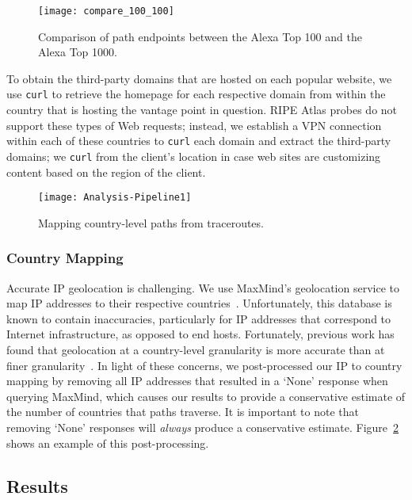 \begin{figure}[t]
\centering
\texttt{[image: compare\_100\_100]}
\caption{Comparison of path endpoints between the Alexa Top 100 and the Alexa Top 1000.}
\label{fig:compare_alexas}
\end{figure}

To obtain the third-party domains that are hosted on each popular website, we
use {\tt curl} to retrieve the homepage for each respective domain from within
the country that is hosting the vantage point in question.  RIPE Atlas probes
do not support these types of Web requests; instead, we establish a VPN
connection within each of these countries to {\tt curl} each domain and
extract the third-party domains; we {\tt curl} from the client's location in
case web sites are customizing content based on the region of the client.

\begin{figure}[t]
\centering
\texttt{[image: Analysis-Pipeline1]}
\caption{Mapping country-level paths from traceroutes.}
\label{fig:analysis_pipeline}
\end{figure}


\subsubsection{Country Mapping}
\label{c_map}

Accurate IP geolocation is challenging. We use MaxMind's
geolocation service to map IP addresses to their respective
countries~\cite{maxmind}. Unfortunately, this database is known to contain inaccuracies,
particularly for IP addresses that correspond to Internet infrastructure, as opposed
to end hosts.  Fortunately, previous work has found that
geolocation at a country-level granularity is more accurate than at
finer granularity~\cite{huffaker2011geocompare}.  In light of these
concerns, we post-processed our IP to country mapping
by removing all IP addresses that resulted in a `None' response when
querying MaxMind, which causes our results to provide a conservative
estimate of the number of countries that paths traverse. It is important
to note that removing `None' responses will \textit{always} produce a
conservative estimate.
Figure~\ref{fig:analysis_pipeline} shows an example of this
post-processing. 

\subsection{Results}

